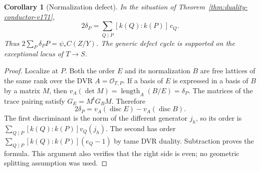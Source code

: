 \documentclass[11pt,reqno]{amsart}
\numberwithin{equation}{section}
\newtheorem{corollary}[theorem]{Corollary}
\theoremstyle{definition}\newtheorem{definition}[theorem]{Definition}
\theoremstyle{remark}\newtheorem{remark}[theorem]{Remark}
\newcommand{\OO}{\mathcal O}\newcommand{\II}{\mathcal I}
\begin{document}
\begin{corollary}[Normalization defect]\label{cor:defect-cycle-v171}
In the situation of Theorem~\ref{thm:duality-conductor-v171},
\begin{equation}\label{eq:defect-cycle-v171}
 2\delta_P=\sum_{Q\mid P}[k(Q):k(P)]\,c_Q.
\end{equation}
Thus $2\sum_P\delta_PP=\psi_*C(Z/Y)$. The generic defect cycle is
supported on the exceptional locus of $T\to S$.
\end{corollary}
\begin{proof}
Localize at $P$. Both the order $E$ and its normalization $B$ are free
lattices of the same rank over the DVR $A=\OO_{T,P}$. If a basis of
$E$ is expressed in a basis of $B$ by a matrix $M$, then
$v_A(\det M)=\operatorname{length}_A(B/E)=\delta_P$.
The matrices of the trace pairing satisfy $G_E=M^{\mathsf t}G_BM$.
Therefore
\[
 2\delta_P=v_A(\operatorname{disc}E)-v_A(\operatorname{disc}B).
\]
The first discriminant is the norm of the different generator $j_h$,
so its order is $\sum_{Q\mid P}[k(Q):k(P)]v_Q(j_h)$. The second has
order $\sum_{Q\mid P}[k(Q):k(P)](e_Q-1)$ by tame DVR duality.
Subtraction proves the formula. This argument also verifies that the
right side is even; no geometric splitting assumption was used.
\end{proof}
\end{document}
